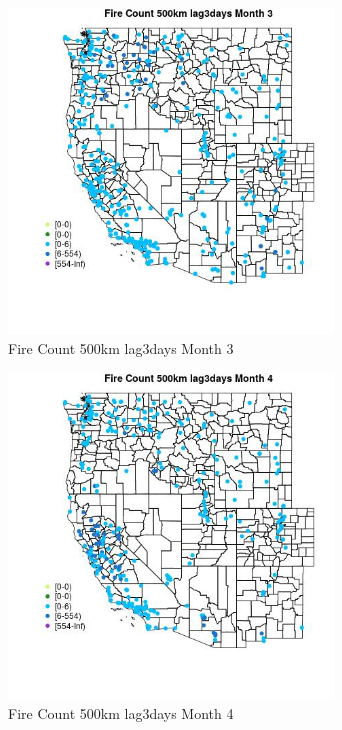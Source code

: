 \begin{figure} 
\centering  
\includegraphics[width=0.77\textwidth]{Code_Outputs/Report_ML_input_PM25_Step4_part_e_de_duplicated_aves_compiled_2019-05-18wNAs_MapObsMo3Fire_Count_500km_lag3days.jpg} 
\caption{\label{fig:Report_ML_input_PM25_Step4_part_e_de_duplicated_aves_compiled_2019-05-18wNAsMapObsMo3Fire_Count_500km_lag3days}Fire Count 500km lag3days Month 3} 
\end{figure} 
 

\begin{figure} 
\centering  
\includegraphics[width=0.77\textwidth]{Code_Outputs/Report_ML_input_PM25_Step4_part_e_de_duplicated_aves_compiled_2019-05-18wNAs_MapObsMo4Fire_Count_500km_lag3days.jpg} 
\caption{\label{fig:Report_ML_input_PM25_Step4_part_e_de_duplicated_aves_compiled_2019-05-18wNAsMapObsMo4Fire_Count_500km_lag3days}Fire Count 500km lag3days Month 4} 
\end{figure} 
 

